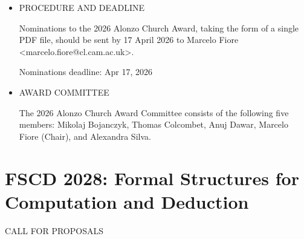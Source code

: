 \documentclass[prodmode,acmtecs]{acmsmall} %
\begin{document}
\begin{itemize}
\item  PROCEDURE AND DEADLINE 
 
  Nominations to the 2026 Alonzo Church Award, taking the form of a single PDF file, should be sent by 17 April 2026 to Marcelo Fiore <marcelo.fiore@cl.cam.ac.uk>. 
 
Nominations deadline: Apr 17, 2026 
 
\item  AWARD COMMITTEE 
 
  The 2026 Alonzo Church Award Committee consists of the following five members: Mikolaj Bojanczyk, Thomas Colcombet, Anuj Dawar, Marcelo Fiore (Chair), and Alexandra Silva. 
 
\end{itemize}\section{FSCD 2028: Formal Structures for Computation and Deduction}\label{FSCD2028}CALL FOR PROPOSALS  
\end{document}
